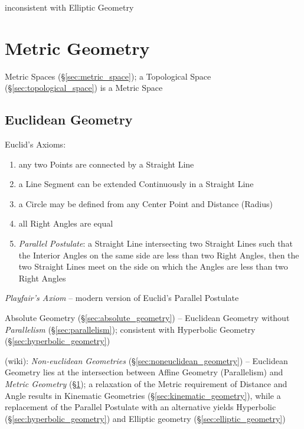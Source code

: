 inconsistent with Elliptic Geometry



\section{Metric Geometry}\label{sec:metric_geometry}

Metric Spaces (\S\ref{sec:metric_space}); a Topological Space
(\S\ref{sec:topological_space}) is a Metric Space



\subsection{Euclidean Geometry}\label{sec:euclidean_geometry}

Euclid's Axioms:
\begin{enumerate}
  \item any two Points are connected by a Straight Line
  \item a Line Segment can be extended Continuously in a Straight Line
  \item a Circle may be defined from any Center Point and Distance (Radius)
  \item all Right Angles are equal
  \item \emph{Parallel Postulate}: a Straight Line intersecting two Straight
    Lines such that the Interior Angles on the same side are less than two Right
    Angles, then the two Straight Lines meet on the side on which the Angles are
    less than two Right Angles
\end{enumerate}

\emph{Playfair's Axiom} -- modern version of Euclid's Parallel Postulate

Absolute Geometry (\S\ref{sec:absolute_geometry}) -- Euclidean Geometry
without \emph{Parallelism} (\S\ref{sec:parallelism}); consistent with Hyperbolic
Geometry (\S\ref{sec:hyperbolic_geometry})

(wiki): \emph{Non-euclidean Geometries} (\S\ref{sec:noneuclidean_geometry}) --
Euclidean Geometry lies at the intersection between Affine Geometry
(Parallelism) and \emph{Metric Geometry} (\S\ref{sec:metric_geometry}); a
relaxation of the Metric requirement of Distance and Angle results in Kinematic
Geometries (\S\ref{sec:kinematic_geometry}), while a replacement of the Parallel
Postulate with an alternative yields Hyperbolic
(\S\ref{sec:hyperbolic_geometry}) and Elliptic geometry
(\S\ref{sec:elliptic_geometry})

